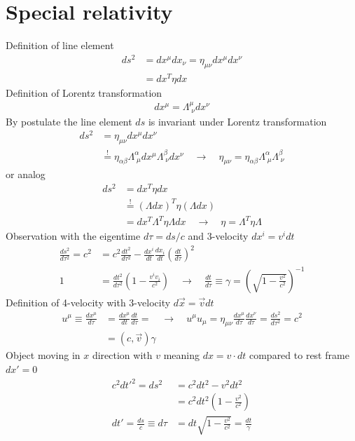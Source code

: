 \documentclass[10pt,a4paper]{book}
\theoremstyle{definition}
\begin{document}
\section{Special relativity}
Definition of line element
\begin{align}
    ds^2 &= dx^\mu dx_\nu = \eta_{\mu\nu}dx^\mu dx^\nu\\
        &= dx^T\eta dx
\end{align}
Definition of Lorentz transformation
\begin{align}
    dx^\mu = \Lambda^\mu_{\;\nu}dx^\nu
\end{align}
By postulate the line element $ds$ is invariant under Lorentz transformation
\begin{align}
    ds^2 &= \eta_{\mu\nu}dx^\mu dx^\nu\\
    &\stackrel{!}{=} \eta_{\alpha\beta}\Lambda^\alpha_{\;\mu}dx^\mu \Lambda^\beta_{\;\nu}dx^\nu\quad\rightarrow\quad \eta_{\mu\nu} = \eta_{\alpha\beta}\Lambda^\alpha_{\;\mu} \Lambda^\beta_{\;\nu}
\end{align}
or analog
\begin{align}
    ds^2 &= dx^T\eta dx\\
    &\stackrel{!}{=} (\Lambda dx)^T\eta (\Lambda dx)\\
    &= dx^T\Lambda^T\eta \Lambda dx\quad\rightarrow\quad \eta = \Lambda^T\eta\Lambda
\end{align}
Observation with the eigentime $d\tau=ds/c$ and 3-velocity $dx^i = v^i dt$
\begin{align}
    \frac{ds^2}{d\tau^2}=c^2&=c^2\frac{dt^2}{d\tau^2}-\frac{dx^i}{dt}\frac{dx_i}{dt}\left(\frac{dt}{d\tau}\right)^2\\
    1&=\frac{dt^2}{d\tau^2}\left(1-\frac{v^iv_i}{c^2}\right)\quad\rightarrow\quad\frac{dt}{d\tau}\equiv\gamma=\left(\sqrt{1-\frac{v^2}{c^2}}\right)^{-1}
\end{align}
Definition of 4-velocity with 3-velocity $d\vec{x} = \vec{v} dt$
\begin{align}
    u^\mu\equiv\frac{dx^\mu}{d\tau}&=\frac{dx^\mu}{dt}\frac{dt}{d\tau}=\quad\rightarrow\quad u^\mu u_\mu=\eta_{\mu\nu}\frac{dx^\mu}{d\tau} \frac{dx^\nu}{d\tau}=\frac{ds^2}{d\tau^2}=c^2\\
    &=(c,\vec{v})\gamma
\end{align}
Object moving in $x$ direction with $v$ meaning $dx=v\cdot dt$ compared to
rest frame $dx'=0$
\begin{align}
    c^2dt'^2=ds^2 &= c^2dt^2- v^2 dt^2\\
    &=c^2dt^2\left(1-\frac{v^2}{c^2}\right)\\
    dt'=\frac{ds}{c}\equiv d\tau&=dt\sqrt{1-\frac{v^2}{c^2}}=\frac{dt}{\gamma}
\end{align}
\end{document}
